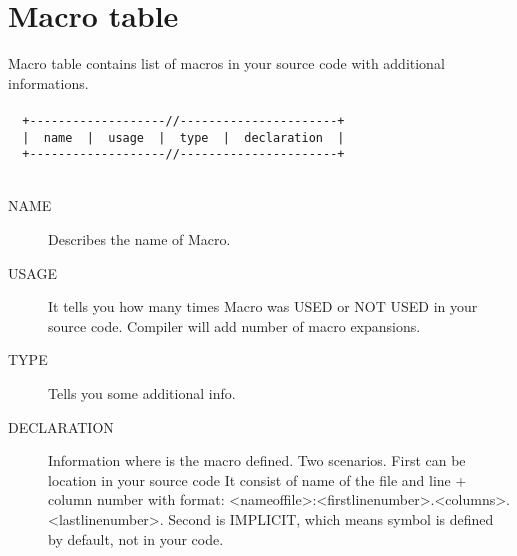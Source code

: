         \section{Macro table}
            Macro table contains list of macros in your source code with additional informations.
            {
                ~\\
                \usecodefont\\
                \verb'  +-------------------//----------------------+'\\
                \verb'  |  name  |  usage  |  type  |  declaration  |'\\
                \verb'  +-------------------//----------------------+'\\
            }\\
            \begin{description}
             \item[NAME] Describes the name of Macro.
             \item[USAGE] It tells you how many times Macro was USED or NOT USED in your source code. Compiler will add number of macro expansions.
             \item[TYPE] Tells you some additional info.
             \item[DECLARATION] Information where is the macro defined. Two scenarios. First can be location in your source code
             It consist of name of the file and line + column number with format: <nameoffile>:<firstlinenumber>.<columns>.<lastlinenumber>.
             Second is IMPLICIT, which means symbol is defined by default, not in your code.
            \end{description}


